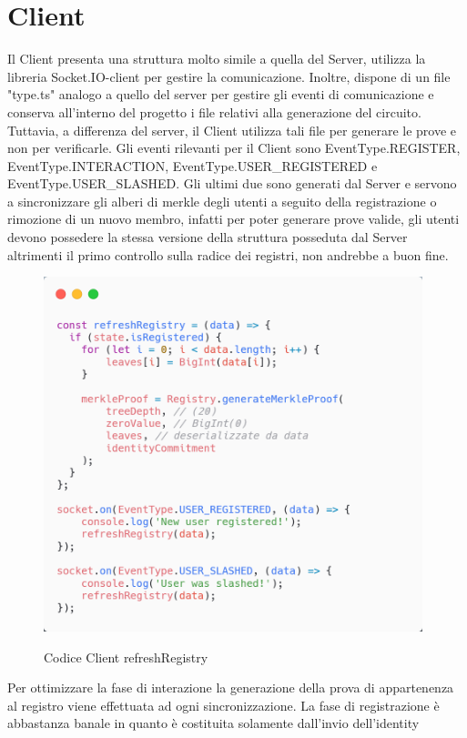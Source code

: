 \section{Client}
Il Client presenta una struttura molto simile a quella del Server, utilizza la libreria Socket.IO-client per gestire la
comunicazione. Inoltre, dispone di un file "type.ts" analogo a quello del server per gestire gli eventi di comunicazione
e conserva all'interno del progetto i file relativi alla generazione del circuito. Tuttavia, a differenza del server, il
Client utilizza tali file per generare le prove e non per verificarle. Gli eventi rilevanti per il Client sono
EventType.REGISTER, EventType.INTERACTION, EventType.USER\_REGISTERED e EventType.USER\_SLASHED. Gli ultimi due sono
generati dal Server e servono a sincronizzare gli alberi di merkle degli utenti a seguito della registrazione o
rimozione di un nuovo membro, infatti per poter generare prove valide, gli utenti devono possedere la stessa versione
della struttura posseduta dal Server altrimenti il primo controllo sulla radice dei registri, non andrebbe a buon fine.
\begin{figure}[H]
    \centering
    \includegraphics[width=11cm]{./chapters/3.poc/images/4.1.client.png}
    \label{fig:1.client}
    \captionsetup{justification=centering}
    \caption{Codice Client refreshRegistry}
\end{figure}
Per ottimizzare la fase di interazione la generazione della prova di appartenenza al registro viene effettuata ad ogni
sincronizzazione. La fase di registrazione è abbastanza banale in quanto è costituita solamente dall'invio dell'identity
